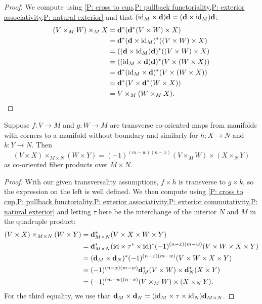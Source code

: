 \begin{proof}
	We compute using \cref{P: cross to cup,P: pullback functoriality,P: exterior associativity,P: natural exterior} and that $(\mathrm{id}_M \times \mathbf{d})\mathbf{d} = (\mathbf{d} \times \mathrm{id}_M)\mathbf{d}$:
	\begin{align*}
		(V \times_M W) \times_M X& = \mathbf{d}^*(\mathbf{d}^*(V \times W) \times X)\\
		& = \mathbf{d}^*(\mathbf{d} \times \mathrm{id}_M)^*((V \times W) \times X)\\
		& = ((\mathbf{d} \times \mathrm{id}_M)\mathbf{d})^*((V \times W) \times X)\\
		& = ((\mathrm{id}_M \times \mathbf{d})\mathbf{d})^*(V \times (W \times X))\\
		& = \mathbf{d}^*(\mathrm{id}_M \times \mathbf{d})^*(V \times (W \times X))\\
		& = \mathbf{d}^*(V \times \mathbf{d}^*(W \times X))\\
		& = V \times_M (W \times_M X).\qedhere
	\end{align*}
\end{proof}

\begin{corollary}\label{C: criss cross}
	Suppose $f \colon V \to M$ and $g \colon W \to M$ are transverse co-oriented maps from manifolds with corners to a manifold without boundary and similarly for $h \colon X \to N$ and $k \colon Y \to N$.
	Then$$(V \times X)\times_{M \times N} (W \times Y) = (-1)^{(m-w)(n-x)} (V \times_M W) \times (X \times_N Y) $$
	as co-oriented fiber products over $M \times N$.
\end{corollary}

\begin{proof}
	With our given transversality assumptions, $f \times h$ is transverse to $g \times k$, so the expression on the left is well defined.
	We then compute using \cref{P: cross to cup,P: pullback functoriality,P: exterior associativity,P: exterior commutativity,P: natural exterior} and letting $\tau$ here be the interchange of the interior $N$ and $M$ in the quadruple product:
	\begin{align*}
		(V \times X)\times_{M \times N} (W \times Y)& = \mathbf{d}_{M \times N}^*(V \times X \times W \times Y)\\
		& = \mathbf{d}_{M \times N}^*(\mathrm{id} \times \tau^* \times \mathrm{id})^*(-1)^{(n-x)(m-w)}(V \times W \times X \times Y)\\
		& = (\mathbf{d}_M \times \mathbf{d}_N)^*(-1)^{(n-x)(m-w)}(V \times W \times X \times Y)\\
		& = (-1)^{(n-x)(m-w)}\mathbf{d}_M^*(V \times W) \times \mathbf{d}_N^*( X \times Y)\\
		& = (-1)^{(m-w)(n-x)} (V \times_M W) \times (X \times_N Y).
	\end{align*}
	For the third equality, we use that $\mathbf{d}_M \times \mathbf{d}_N = (\mathrm{id}_M \times \tau \times \mathrm{id}_N)\mathbf{d}_{M \times N}$.
\end{proof}

